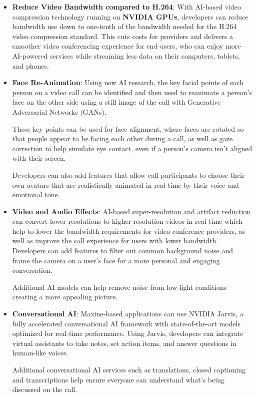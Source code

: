 \begin{itemize}
    \item \textbf{Reduce Video Bandwidth compared to H.264}: 
    With AI-based video compression technology running on \textbf{NVIDIA GPUs}, 
    developers can reduce bandwidth use down to one-tenth of the bandwidth needed 
    for the H.264 video compression standard. This cuts costs for providers and 
    delivers a smoother video conferencing experience for end-users, who can enjoy 
    more AI-powered services while streaming less data on their computers, tablets, and phones.
    
    \item \textbf{Face Re-Animation}:
    Using new AI research, the key facial points of each person on a video call can be identified
    and then used to reanimate a person’s face on the other side using a still image
    of the call with Generative Adversarial Networks (GANs).
    
    These key points can be used for face alignment, where faces are rotated so that
    people appear to be facing each other during a call, as well as gaze correction 
    to help simulate eye contact, even if a person’s camera isn’t aligned with their screen.
    
    Developers can also add features that allow call participants to choose their
    own avatars that are realistically animated in real-time by their voice and emotional tone.

    \item \textbf{Video and Audio Effects}:
    AI-based super-resolution and artifact reduction can convert lower resolutions to higher
    resolution videos in real-time which help to lower the bandwidth requirements for video 
    conference providers, as well as improve the call experience for users with lower bandwidth. 
    Developers can add features to filter out common background noise and frame the camera on a user’s 
    face for a more personal and engaging conversation.
    
    Additional AI models can help remove noise from low-light conditions creating a more appealing picture.

    \item \textbf{Conversational AI}:
    Maxine-based applications can use NVIDIA Jarvis, a fully accelerated conversational
    AI framework with state-of-the-art models optimized for real-time performance. Using Jarvis, 
    developers can integrate virtual assistants to take notes, set action items, and answer questions in human-like voices.
    
    Additional conversational AI services such as translations, closed captioning and transcriptions help ensure everyone can understand what’s being discussed on the call.
\end{itemize}

